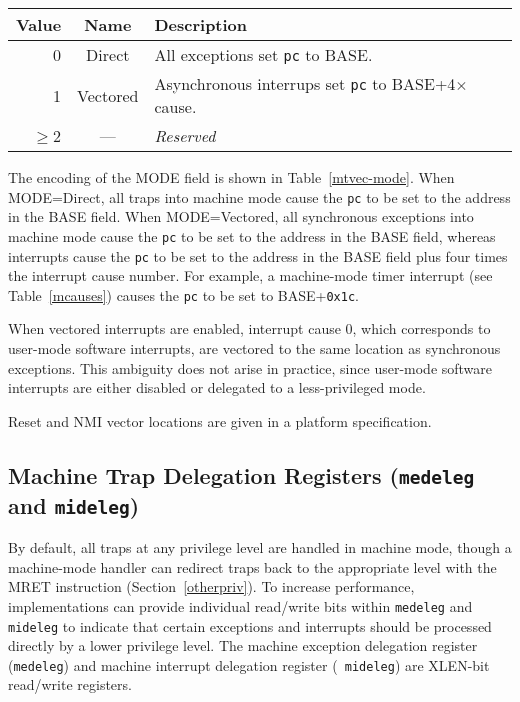 \begin{table*}[h!]
\begin{center}
\begin{tabular}{|r|c|l|}
\hline
Value & Name & Description \\
\hline	 
0      & Direct   & All exceptions set {\tt pc} to BASE. \\
1      & Vectored & Asynchronous interrups set {\tt pc} to BASE+4$\times$cause. \\
$\ge$2 & --- & {\em Reserved} \\
\hline
\end{tabular}
\end{center}
\caption{Encoding of {\tt mtvec} MODE field.}
\label{mtvec-mode}
\end{table*}

The encoding of the MODE field is shown in Table~\ref{mtvec-mode}.  When
MODE=Direct, all traps into machine mode cause the {\tt pc} to be set to the
address in the BASE field.  When MODE=Vectored, all synchronous exceptions
into machine mode cause the {\tt pc} to be set to the address in the BASE
field, whereas interrupts cause the {\tt pc} to be set to the address in
the BASE field plus four times the interrupt cause number.  For example,
a machine-mode timer interrupt (see Table~\ref{mcauses}) causes the {\tt pc}
to be set to BASE+{\tt 0x1c}.

\begin{commentary}
When vectored interrupts are enabled, interrupt cause 0, which corresponds to
user-mode software interrupts, are vectored to the same location as
synchronous exceptions.  This ambiguity does not arise in practice, since
user-mode software interrupts are either disabled or delegated to
a less-privileged mode.
\end{commentary}

\begin{commentary}
Reset and NMI vector locations are given in a platform specification.
\end{commentary}

\subsection{Machine Trap Delegation Registers ({\tt medeleg} and {\tt mideleg})}

By default, all traps at any privilege level are handled in machine
mode, though a machine-mode handler can redirect traps back to the
appropriate level with the MRET instruction (Section~\ref{otherpriv}).
To increase performance, implementations can provide individual
read/write bits within {\tt medeleg} and {\tt mideleg} to indicate
that certain exceptions and interrupts should be processed directly by
a lower privilege level.  The machine exception delegation register
({\tt medeleg}) and machine interrupt delegation register ({\tt
  mideleg}) are XLEN-bit read/write registers.

